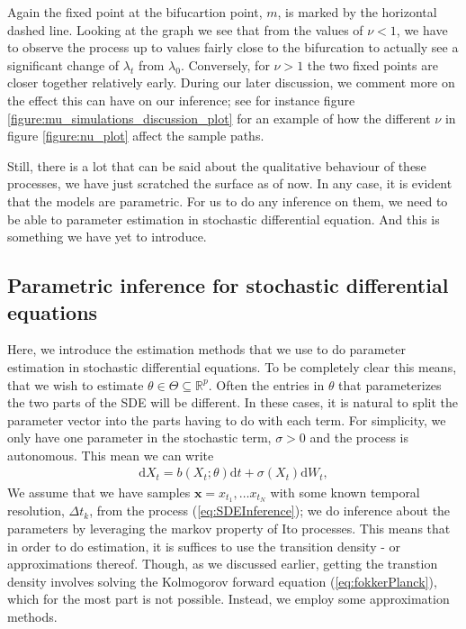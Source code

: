 Again the fixed point at the bifucartion point, $m$, is marked by the horizontal dashed line. Looking at the graph we see that from the values of $\nu < 1$, we have to observe the process up to values fairly close to the bifurcation to actually see a significant change of $\lambda_t$ from $\lambda_0$. Conversely, for $\nu>1$ the two fixed points are closer together relatively early. During our later discussion, we comment more on the effect this can have on our inference; see for instance figure \ref{figure:mu_simulations_discussion_plot} for an example of how the different $\nu$ in figure \ref{figure:nu_plot} affect the sample paths. 

Still, there is a lot that can be said about the qualitative behaviour of these processes, we have just scratched the surface as of now. In any case, it is evident that the models are parametric. For us to do any inference on them, we need to be able to parameter estimation in stochastic differential equation. And this is something we have yet to introduce.
\subsection{Parametric inference for stochastic differential equations}
Here, we introduce the estimation methods that we use to do parameter estimation in stochastic differential equations. To be completely clear this means, that we wish to estimate $\theta\in\Theta\subseteq\mathbb{R}^p$. Often the entries in $\theta$ that parameterizes the two parts of the SDE will be different. In these cases, it is natural to split the parameter vector into the parts having to do with each term. For simplicity, we only have one parameter in the stochastic term, $\sigma>0$ and the process is autonomous. This mean we can write
\begin{align}
    \mathrm{d}X_t = b(X_t; \theta)\mathrm{d}t + \sigma\left(X_t\right)\mathrm{d}W_t, \label{eq:SDEInference}
\end{align}
We assume that we have samples $\mathbf{x} = x_{t_1},\dots x_{t_N}$ with some known temporal resolution, $\Delta t_k$, from the process (\ref{eq:SDEInference}); we do inference about the parameters by leveraging the markov property of Ito processes. This means that in order to do estimation, it is suffices to use the transition density - or approximations thereof. Though, as we discussed earlier, getting the transtion density involves solving the Kolmogorov forward equation (\ref{eq:fokkerPlanck}), which for the most part is not possible. Instead, we employ some approximation methods.

